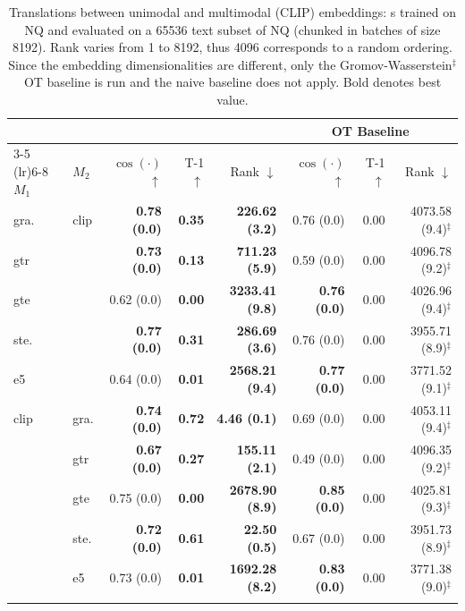 \begin{table}[!b]
    \scriptsize
    \centering
    \begin{tabular}{llrrrrrr}
        \toprule
        \multicolumn{2}{c}{} & \multicolumn{3}{c}{\atk{}} & \multicolumn{3}{c}{OT Baseline}\\
        \cmidrule(lr){3-5} \cmidrule(lr){6-8}
        $M_1$ & $M_2$ & $\cos(\cdot)$ $\uparrow$ & T-1 $\uparrow$ & Rank $\downarrow$ & $\cos(\cdot)$ $\uparrow$ & T-1 $\uparrow$ & Rank $\downarrow$\\
        \midrule
        gra. & \multirow{5.5}{*}{clip} & \textbf{0.78 {\tiny (0.0)}} & \textbf{0.35} & \textbf{226.62 {\tiny (3.2)}} & 0.76 {\tiny (0.0)} & 0.00 & 4073.58 {\tiny (9.4)}$^{\ddagger}$ \\
        gtr & & \textbf{0.73 {\tiny (0.0)}} & \textbf{0.13} & \textbf{711.23 {\tiny (5.9)}} & 0.59 {\tiny (0.0)} & 0.00 & 4096.78 {\tiny (9.2)}$^{\ddagger}$ \\
        gte & & 0.62 {\tiny (0.0)} & \textbf{0.00} & \textbf{3233.41 {\tiny (9.8)}} & \textbf{0.76 {\tiny (0.0)}} & 0.00 & 4026.96 {\tiny (9.4)}$^{\ddagger}$\\
        ste. & & \textbf{0.77 {\tiny (0.0)}} & \textbf{0.31} & \textbf{286.69 {\tiny (3.6)}} & 0.76 {\tiny (0.0)} & 0.00 & 3955.71 {\tiny (8.9)}$^{\ddagger}$ \\
        e5 & & 0.64 {\tiny (0.0)} & \textbf{0.01} & \textbf{2568.21 {\tiny (9.4)}} & \textbf{0.77 {\tiny (0.0)}} & 0.00 & 3771.52 {\tiny (9.1)}$^{\ddagger}$ \\
        \midrule
        \multirow{5.5}{*}{clip} & gra. & \textbf{0.74 {\tiny (0.0)}} & \textbf{0.72} & \textbf{4.46 {\tiny (0.1)}} & 0.69 {\tiny (0.0)} & 0.00 & 4053.11 {\tiny (9.4)}$^{\ddagger}$\\
         & gtr & \textbf{0.67 {\tiny (0.0)}} & \textbf{0.27} & \textbf{155.11 {\tiny (2.1)}} & 0.49 {\tiny (0.0)} & 0.00 & 4096.35 {\tiny (9.2)}$^{\ddagger}$ \\
         & gte & 0.75 {\tiny (0.0)} & \textbf{0.00} & \textbf{2678.90 {\tiny (8.9)}} & \textbf{0.85 {\tiny (0.0)}} & 0.00 & 4025.81 {\tiny (9.3)}$^{\ddagger}$ \\
         & ste. & \textbf{0.72 {\tiny (0.0)}} & \textbf{0.61} & \textbf{22.50 {\tiny (0.5)}} & 0.67 {\tiny (0.0)} & 0.00 & 3951.73 {\tiny (8.9)}$^{\ddagger}$ \\
         & e5 & 0.73 {\tiny (0.0)} & \textbf{0.01} & \textbf{1692.28 {\tiny (8.2)}} & \textbf{0.83 {\tiny (0.0)}} & 0.00 & 3771.38 {\tiny (9.0)}$^{\ddagger}$ \\
        \bottomrule\\[-1.6ex]
    \end{tabular}
    \caption{Translations between unimodal and multimodal (CLIP) embeddings: \atk{}s trained on NQ and evaluated on a 65536 text subset of NQ (chunked in batches of size 8192). Rank varies from 1 to 8192, thus 4096 corresponds to a random ordering. Since the embedding dimensionalities are different, only the Gromov-Wasserstein$^{\ddagger}$ OT baseline is run and the naive baseline does not apply. Bold denotes best value.}
    \label{tab:CLIP_nq}
\end{table} 

